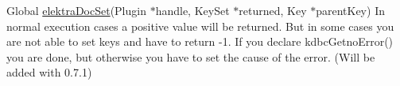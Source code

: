 \label{err__err000001}
\hypertarget{err__err000001}{}
 
\begin{DoxyDescription}
\item[Global \hyperlink{group__plugin_gae65781a1deb34efc79c8cb9d9174842c}{elektraDocSet}(Plugin $\ast$handle, KeySet $\ast$returned, Key $\ast$parentKey) ]In normal execution cases a positive value will be returned. But in some cases you are not able to set keys and have to return -\/1. If you declare kdbcGetnoError() you are done, but otherwise you have to set the cause of the error. (Will be added with 0.7.1)
\end{DoxyDescription}